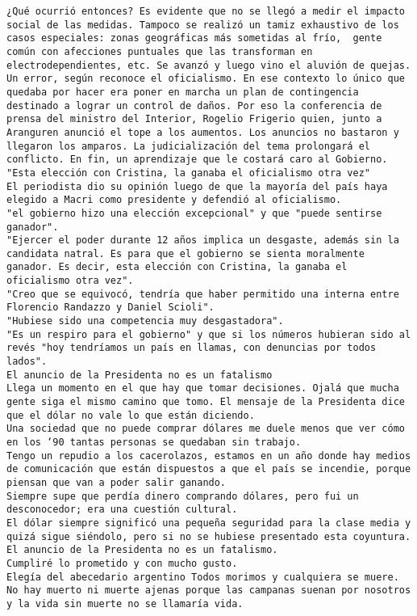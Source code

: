 \documentclass[11pt]{article}
\begin{document}
\begin{Verbatim}[commandchars=\\\{\}]
¿Qué ocurrió entonces? Es evidente que no se llegó a medir el impacto social de las medidas. Tampoco se realizó un tamiz exhaustivo de los casos especiales: zonas geográficas más sometidas al frío,  gente común con afecciones puntuales que las transforman en electrodependientes, etc. Se avanzó y luego vino el aluvión de quejas. Un error, según reconoce el oficialismo. En ese contexto lo único que quedaba por hacer era poner en marcha un plan de contingencia destinado a lograr un control de daños. Por eso la conferencia de prensa del ministro del Interior, Rogelio Frigerio quien, junto a Aranguren anunció el tope a los aumentos. Los anuncios no bastaron y llegaron los amparos. La judicialización del tema prolongará el conflicto. En fin, un aprendizaje que le costará caro al Gobierno.
﻿"Esta elección con Cristina, la ganaba el oficialismo otra vez"
El periodista dio su opinión luego de que la mayoría del país haya elegido a Macri como presidente y defendió al oficialismo.
"el gobierno hizo una elección excepcional" y que "puede sentirse ganador".
"Ejercer el poder durante 12 años implica un desgaste, además sin la candidata natral. Es para que el gobierno se sienta moralmente ganador. Es decir, esta elección con Cristina, la ganaba el oficialismo otra vez".
"Creo que se equivocó, tendría que haber permitido una interna entre Florencio Randazzo y Daniel Scioli".
"Hubiese sido una competencia muy desgastadora".
"Es un respiro para el gobierno" y que si los números hubieran sido al revés "hoy tendríamos un país en llamas, con denuncias por todos lados".
﻿El anuncio de la Presidenta no es un fatalismo
Llega un momento en el que hay que tomar decisiones. Ojalá que mucha gente siga el mismo camino que tomo. El mensaje de la Presidenta dice que el dólar no vale lo que están diciendo.
Una sociedad que no puede comprar dólares me duele menos que ver cómo en los ‘90 tantas personas se quedaban sin trabajo.
Tengo un repudio a los cacerolazos, estamos en un año donde hay medios de comunicación que están dispuestos a que el país se incendie, porque piensan que van a poder salir ganando.
Siempre supe que perdía dinero comprando dólares, pero fui un desconocedor; era una cuestión cultural.
El dólar siempre significó una pequeña seguridad para la clase media y quizá sigue siéndolo, pero si no se hubiese presentado esta coyuntura.
El anuncio de la Presidenta no es un fatalismo.
Cumpliré lo prometido y con mucho gusto.
﻿Elegía del abecedario argentino Todos morimos y cualquiera se muere.
No hay muerto ni muerte ajenas porque las campanas suenan por nosotros
y la vida sin muerte no se llamaría vida.

\end{Verbatim}
\end{document}
